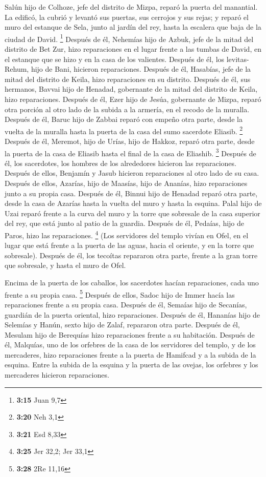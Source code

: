  Salún hijo de Colhoze, jefe del distrito de Mizpa,
reparó la puerta del manantial. La edificó, la cubrió y levantó sus
puertas, sus cerrojos y sus rejas; y reparó el muro del estanque de
Sela, junto al jardín del rey, hasta la escalera que baja de la ciudad
de David. \footnote{\textbf{3:15} Juan 9,7}  Después de
él, Nehemías hijo de Azbuk, jefe de la mitad del distrito de Bet Zur,
hizo reparaciones en el lugar frente a las tumbas de David, en el
estanque que se hizo y en la casa de los valientes. 
Después de él, los levitas-Rehum, hijo de Bani, hicieron reparaciones.
Después de él, Hasabías, jefe de la mitad del distrito de Keila, hizo
reparaciones en su distrito.  Después de él, sus
hermanos, Bavvai hijo de Henadad, gobernante de la mitad del distrito de
Keila, hizo reparaciones.  Después de él, Ezer hijo de
Jesúa, gobernante de Mizpa, reparó otra porción al otro lado de la
subida a la armería, en el recodo de la muralla.  Después
de él, Baruc hijo de Zabbai reparó con empeño otra parte, desde la
vuelta de la muralla hasta la puerta de la casa del sumo sacerdote
Eliasib. \footnote{\textbf{3:20} Neh 3,1}  Después de él,
Meremot, hijo de Urías, hijo de Hakkoz, reparó otra parte, desde la
puerta de la casa de Eliasib hasta el final de la casa de Eliashib.
\footnote{\textbf{3:21} Esd 8,33}  Después de él, los
sacerdotes, los hombres de los alrededores hicieron las reparaciones.
 Después de ellos, Benjamín y Jasub hicieron reparaciones
al otro lado de su casa. Después de ellos, Azarías, hijo de Maasías,
hijo de Ananías, hizo reparaciones junto a su propia casa.
 Después de él, Binnui hijo de Henadad reparó otra parte,
desde la casa de Azarías hasta la vuelta del muro y hasta la esquina.
 Palal hijo de Uzai reparó frente a la curva del muro y
la torre que sobresale de la casa superior del rey, que está junto al
patio de la guardia. Después de él, Pedaías, hijo de Paros, hizo las
reparaciones. \footnote{\textbf{3:25} Jer 32,2; Jer 33,1}
 (Los servidores del templo vivían en Ofel, en el lugar
que está frente a la puerta de las aguas, hacia el oriente, y en la
torre que sobresale).  Después de él, los tecoítas
repararon otra parte, frente a la gran torre que sobresale, y hasta el
muro de Ofel.

 Encima de la puerta de los caballos, los sacerdotes
hacían reparaciones, cada uno frente a su propia casa. \footnote{\textbf{3:28}
  2Re 11,16}  Después de ellos, Sadoc hijo de Immer hacía
las reparaciones frente a su propia casa. Después de él, Semaías hijo de
Secanías, guardián de la puerta oriental, hizo reparaciones.
 Después de él, Hananías hijo de Selemías y Hanún, sexto
hijo de Zalaf, repararon otra parte. Después de él, Mesulam hijo de
Berequías hizo reparaciones frente a su habitación. 
Después de él, Malquías, uno de los orfebres de la casa de los
servidores del templo, y de los mercaderes, hizo reparaciones frente a
la puerta de Hamifcad y a la subida de la esquina.  Entre
la subida de la esquina y la puerta de las ovejas, los orfebres y los
mercaderes hicieron reparaciones.

